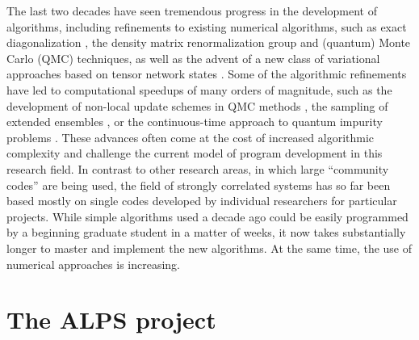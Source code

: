 \documentclass[12pt]{iopart}
\begin{document}
The last two decades have seen tremendous progress in the development of
algorithms, including refinements to existing numerical algorithms, such as exact diagonalization \cite{lanczos},
the density matrix renormalization group \cite{White1992,Schollwock2005,Daley2004,White2004} and (quantum) 
Monte Carlo (QMC) techniques, as well as the advent of a new class of variational approaches based on 
tensor network states \cite{vidal1,vidal2,Verstraete04,Murg07,vidal07}. 
Some of the algorithmic refinements have led to computational speedups of many orders of magnitude, such as 
the development of non-local update schemes \cite{Swendsen87,Wolff89} in QMC methods \cite{Evertz93,Prokofev98A,Sandvik99,Todo01,looper,Sylyuasen, Evertz03,Alet2005}, 
the sampling of extended ensembles \cite{Wang01,Wang01b,Troyer03,Trebst04,Katzgraber06,Wessel07},
or the continuous-time approach to quantum impurity problems \cite{Rubtsov04,Rubtsov05,Werner06,Werner06Kondo, Gull08_ctaux}.
These advances often come at the cost of increased algorithmic
complexity and challenge the current model of program development in
this research field. In contrast to other research areas, in which
large ``community codes'' are being used, the field of strongly
correlated systems has so far been based mostly on single codes developed by
individual researchers for particular projects. While simple
algorithms used a decade ago could be easily programmed by a beginning
graduate student in a matter of weeks, it now takes substantially
longer to master and implement the new algorithms. At the same time, the use of numerical approaches is increasing. 

\section{The ALPS project}
\end{document}
